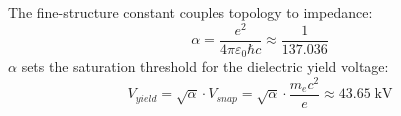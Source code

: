 %
\begin{tcolorbox}[colframe=black!70, colback=gray!5, title=Axiom 2 — Fine Structure]
The fine-structure constant couples topology to impedance:
\begin{equation}
    \alpha = \frac{e^2}{4\pi\varepsilon_0\hbar c} \approx \frac{1}{137.036}
    \label{eq:axiom2_alpha}
\end{equation}
$\alpha$ sets the saturation threshold for the dielectric yield voltage:
\begin{equation}
    V_{yield} = \sqrt{\alpha} \cdot V_{snap} = \sqrt{\alpha} \cdot \frac{m_e c^2}{e} \approx 43.65\;\text{kV}
    \label{eq:axiom2_v_yield}
\end{equation}
\end{tcolorbox}
